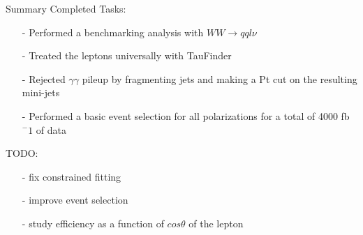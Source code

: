 \documentclass[10pt]{beamer}
\begin{document}
\begin{frame}{Summary}
Completed Tasks:
\begin{itemize}
	\item[-] Performed a benchmarking analysis with $WW\rightarrow qql\nu$
	\item[-] Treated the leptons universally with TauFinder
	\item[-] Rejected $\gamma \gamma$ pileup by fragmenting jets and making a Pt cut on the resulting mini-jets
	\item[-] Performed a basic event selection for all polarizations for a total of 4000 fb$^-1$ of data
	
\end{itemize}
TODO:
\begin{itemize}
	\item[-] fix constrained fitting
	\item[-] improve event selection
	\item[-] study efficiency as a function of $cos\theta$ of the lepton 

\end{itemize}

\end{frame}
\end{document}
